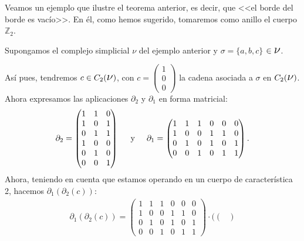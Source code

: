 \documentclass[12pt, a4paper, twoside]{book}
\numberwithin{equation}{section}
\theoremstyle{definition}
\newenvironment{ejem}
  {\pushQED{\qed}\renewcommand{\qedsymbol}{$\blacktriangleleft$}\ejemplo}
  {\popQED\endejemplo}
\theoremstyle{remark}
\theoremstyle{plain}
\begin{document}
	Veamos un ejemplo que ilustre el teorema anterior, es decir, que 
	<<el borde del borde es vacío>>. En él, como hemos sugerido, tomaremos 
	como anillo el cuerpo $\mathbb{Z}_{2}$.

	\begin{ejem}
		Supongamos el complejo simplicial {\Large $\nu$} del ejemplo 
		anterior y $\sigma = \{a,b,c\}$ $\in \text{{\Large $\nu$}}$.

		Así pues, tendremos $c \in C_{2}(\text{{\Large $\nu$}})$, con
		$c=\begin{pmatrix}
			1 \\
			0 \\
			0 
		\end{pmatrix}$ la cadena asociada a $\sigma$ en $C_{2}(
		\text{{\Large $\nu$}})$. Ahora expresamos las aplicaciones 
		$\partial_{2}$ y $\partial_{1}$ en forma matricial:
		\begin{equation*}
			\partial_{2}= \begin{pmatrix}
				1 & 1 & 0 \\
				1 & 0 & 1 \\
				0 & 1 & 1 \\
				1 & 0 & 0 \\
				0 & 1 & 0 \\
				0 & 0 & 1
			\end{pmatrix}
			\hspace{0.5cm}\text{y}\hspace{0.5cm}
			\partial_{1}= \begin{pmatrix}
				1 & 1 & 1 & 0 & 0 &0 \\
				1 & 0 & 0 & 1 & 1 &0 \\
				0 & 1 & 0 & 1 & 0 &1 \\
				0 & 0 & 1 & 0 & 1 &1
			\end{pmatrix}.
		\end{equation*}
		Ahora, teniendo en cuenta que estamos operando en un cuerpo de 
		característica 2, hacemos $\partial_{1}(\partial_{2}(c))$:
		\begin{equation*}
			\begin{split}
				\partial_{1}(\partial_{2}(c))=\begin{pmatrix}
				1 & 1 & 1 & 0 & 0 &0 \\
				1 & 0 & 0 & 1 & 1 &0 \\
				0 & 1 & 0 & 1 & 0 &1 \\
				0 & 0 & 1 & 0 & 1 &1
			\end{pmatrix}\cdot \Bigg( 
				\begin{pmatrix}

\end{pmatrix}
\end{split}
\end{equation*}
\end{ejem}
\end{document}
